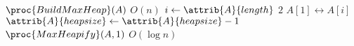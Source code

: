 \begin{codebox}
\li $\proc{BuildMaxHeap}(A)$ 
    \Comment $O(n)$
\li \For $i \gets \attrib{A}{length}$  \To $2$
\li     \Do
            $A[1] \leftrightarrow A[i]$
\li         $\attrib{A}{heapsize} \gets \attrib{A}{heapsize} - 1 $
\li         $\proc{MaxHeapify}(A,1)$
                \Comment $O(\log n)$
        \End
\end{codebox}